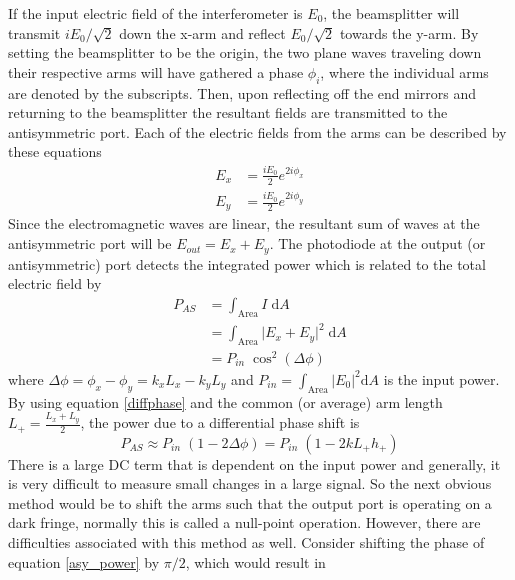 		If the input electric field of the interferometer is $E_0$, the beamsplitter will transmit $iE_0 /\sqrt{2}$ down the x-arm and reflect $E_0 /\sqrt{2}$ towards the y-arm.  By setting the beamsplitter to be the origin, the two plane waves traveling down their respective arms will have gathered a phase $\phi_i$, where the individual arms are denoted by the subscripts. Then, upon reflecting off the end mirrors and returning to the beamsplitter the resultant fields are transmitted to the antisymmetric port. Each of the electric fields from the arms can be described by these equations
			\begin{equation}
			\begin{aligned}
				E_{x} 	&=	\frac{i E_0}{2} e^{2i\phi_{x}}	
			\\	E_{y} 	&=	\frac{i E_0}{2} e^{2i\phi_{y}}
			\end{aligned}
			\end{equation}
		Since the electromagnetic waves are linear, the resultant sum of waves at the antisymmetric port will be $E_{out} = E_x + E_y$. The photodiode at the output (or antisymmetric) port detects the integrated power which is related to the total electric field by
			\begin{equation}
			\begin{aligned}\label{asy_power}
				P_{AS}	&= \int_{\text{Area}} I \;				\text{d}A 
			\\			&= \int_{\text{Area}} \vert E_x + E_y \vert^2 \;	\text{d}A 
			\\			&= P_{in} \; \cos^2(\Delta \phi)
			\end{aligned}
			\end{equation}	
		where $\Delta \phi = \phi_{x} - \phi_{y} = k_x L_x - k_y L_y$ and $P_{in} = \int_{\text{Area}}	 \vert E_0\vert^2 \text{d}A$ is the input power. By using equation \ref{diffphase} and the common (or average) arm length $L_{+} = \frac{L_x + L_y}{2}$, the power due to a differential phase shift is
			\begin{equation}
			P_{AS} \approx P_{in} \; (1-2 \Delta \phi) = P_{in} \; (1-2 k L_{+} h_{+})
			\end{equation}
		There is a large DC term that is dependent on the input power and generally, it is very difficult to measure small changes in a large signal. So the next obvious method would be to shift the arms such that the output port is operating on a dark fringe, normally this is called a null-point operation.  However, there are difficulties associated with this method as well. Consider shifting the phase of equation \ref{asy_power} by $\pi/2$, which would result in

